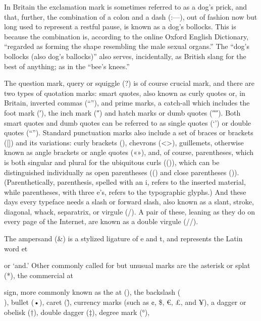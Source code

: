 \documentclass[12pt,a4paper,twocolumn]{book} %
\begin{document}
In Britain the exclamation mark is sometimes referred to as a dog’s prick, and that, further, the combination of a colon and a dash (:—), out of fashion now but long used to represent a restful pause, is known as a dog’s bollocks. This is because the combination is, according to the online Oxford English Dictionary, “regarded as forming the shape resembling the male sexual organs.” The “dog’s bollocks (also dog’s ballocks)” also serves, incidentally, as British slang for the best of anything; as in the “bee’s knees.”

The question mark, query or squiggle (?) is of course crucial mark, and there are two types of quotation marks: smart quotes, also known as curly quotes or, in Britain, inverted commas (“”), and prime marks, a catch-all which includes the foot mark (′), the inch mark (″) and hatch marks or dumb quotes (″″). Both smart quotes and dumb quotes can be referred to as single quotes (‘’) or double quotes (“”). Standard punctuation marks also include a set of braces or brackets ([]) and its variations: curly brackets ({}), chevrons (<>), guillemets, otherwise known as angle brackets or angle quotes («»), and, of course, parentheses, which is both singular and plural for the ubiquitous curls (()), which can be distinguished individually as open parentheses (() and close parentheses ()). (Parenthetically, parenthesis, spelled with an i, refers to the inserted material, while parentheses, with three e’s, refers to the typographic glyphs.) And these days every typeface needs a slash or forward slash, also known as a slant, stroke, diagonal, whack, separatrix, or virgule (/). A pair of these, leaning as they do on every page of the Internet, are known as a double virgule (//).

The ampersand (\&) is a stylized ligature of e and t, and represents the Latin word et

 or ‘and.’ Other commonly called for but unusual marks are the asterisk or splat (*), the commercial at

 sign, more commonly known as the at (\@), the backslash (\\), bullet (•), caret (\^), currency marks (such as ¢, \$, €, £, and ¥), a dagger or obelisk (†), double dagger (‡), degree mark (°),

\end{document}
